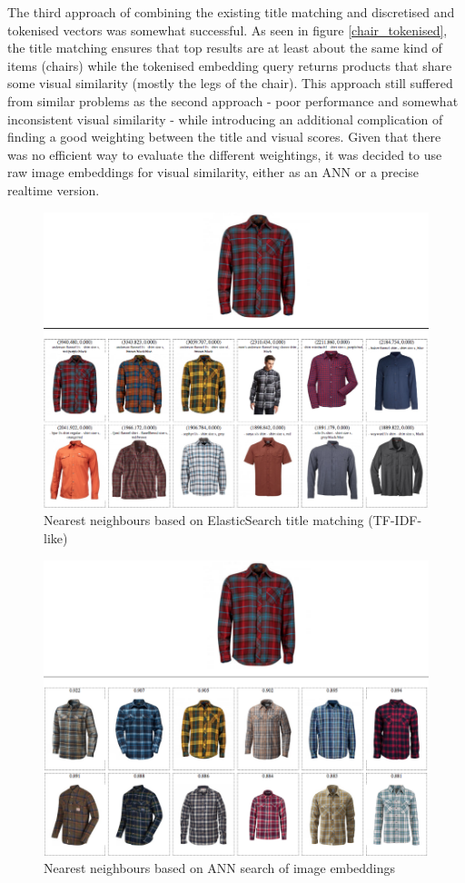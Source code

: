 The third approach of combining the existing title matching and discretised and tokenised vectors was somewhat successful.
As seen in figure \ref{chair_tokenised}, the title matching ensures that top results are at least about the same kind of items (chairs) while the tokenised embedding query returns products that share some visual similarity (mostly the legs of the chair).
This approach still suffered from similar problems as the second approach - poor performance and somewhat inconsistent visual similarity - while introducing an additional complication of finding a good weighting between the title and visual scores.
Given that there was no efficient way to evaluate the different weightings, it was decided to use raw image embeddings for visual similarity, either as an ANN or a precise realtime version.

\begin{figure}
  \centering
  \includegraphics[width=0.8\linewidth]{figures/compare/shirt_es}
  \caption{Nearest neighbours based on ElasticSearch title matching (TF-IDF-like)}
  \label{shirt_es}
\end{figure}
\begin{figure}
  \centering
  \includegraphics[width=0.8\linewidth]{figures/compare/shirt_nmslib}
  \caption{Nearest neighbours based on ANN search of image embeddings}
  \label{shirt_nmslib}
\end{figure}

